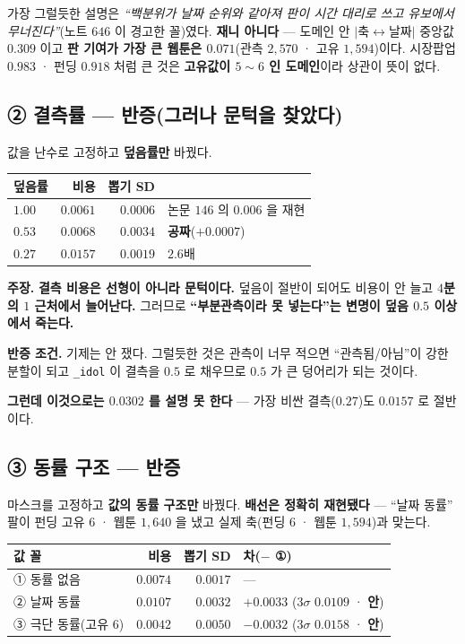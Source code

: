 \documentclass[10pt,a4paper]{article}
\newcommand{\claim}[2]{\begin{claimbox}\textbf{주장.} #1\par\smallskip
  \textcolor{gray!70}{\textbf{반증 조건.} #2}\end{claimbox}}
\begin{document}
가장 그럴듯한 설명은 \emph{``백분위가 날짜 순위와 같아져 판이 시간 대리로 쓰고
유보에서 무너진다''}(노트 $646$ 이 경고한 꼴)였다. \textbf{재니 아니다} --- 도메인 안
$|$축$\leftrightarrow$날짜$|$ 중앙값 $\mathbf{0.309}$ 이고 \textbf{판 기여가 가장 큰
웹툰은 $0.071$}(관측 $2{,}570$ · 고유 $1{,}594$)이다. 시장팝업 $0.983$ · 펀딩 $0.918$
처럼 큰 것은 \textbf{고유값이 $5{\sim}6$ 인 도메인}이라 상관이 뜻이 없다.

\subsection*{② 결측률 --- 반증(그러나 문턱을 찾았다)}

값을 난수로 고정하고 \textbf{덮음률만} 바꿨다.

\begin{center}
\begin{tabular}{lrrl}
\toprule
덮음률 & 비용 & 뽑기 SD & \\
\midrule
$1.00$ & $0.0061$ & $0.0006$ & 논문 $146$ 의 $0.006$ 을 재현 \\
$0.53$ & $0.0068$ & $0.0034$ & \textbf{공짜}($+0.0007$) \\
$0.27$ & $0.0157$ & $0.0019$ & $2.6$배 \\
\bottomrule
\end{tabular}
\end{center}

\claim{\textbf{결측 비용은 선형이 아니라 문턱이다.} 덮음이 절반이 되어도 비용이 안
늘고 \textbf{$4$분의 $1$ 근처에서 늘어난다.} 그러므로 \textbf{``부분관측이라 못
넣는다''는 변명이 덮음 $0.5$ 이상에서 죽는다.}}
{기제는 안 쟀다. 그럴듯한 것은 관측이 너무 적으면 ``관측됨/아님''이 강한 분할이 되고
\texttt{\_idol} 이 결측을 $0.5$ 로 채우므로 $0.5$ 가 큰 덩어리가 되는 것이다.}

\textbf{그런데 이것으로는 $0.0302$ 를 설명 못 한다} --- 가장 비싼 결측($0.27$)도
$0.0157$ 로 절반이다.

\subsection*{③ 동률 구조 --- 반증}

마스크를 고정하고 \textbf{값의 동률 구조만} 바꿨다. \textbf{배선은 정확히
재현됐다} --- ``날짜 동률'' 팔이 펀딩 고유 $6$ · 웹툰 $1{,}640$ 을 냈고 실제
축(펀딩 $6$ · 웹툰 $1{,}594$)과 맞는다.

\begin{center}
\begin{tabular}{lrrl}
\toprule
값 꼴 & 비용 & 뽑기 SD & 차($-$ ①) \\
\midrule
① 동률 없음 & $0.0074$ & $0.0017$ & --- \\
② 날짜 동률 & $0.0107$ & $0.0032$ & $+0.0033$ ($3\sigma$ $0.0109$ · \textbf{안}) \\
③ 극단 동률(고유 $6$) & $0.0042$ & $0.0050$ & $-0.0032$ ($3\sigma$ $0.0158$ · \textbf{안}) \\
\bottomrule
\end{tabular}
\end{center}
\end{document}
